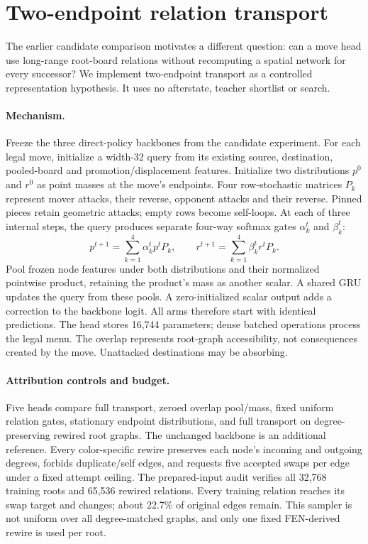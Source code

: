 \section{Two-endpoint relation transport}
The earlier candidate comparison motivates a different question: can a move
head use long-range root-board relations without recomputing a spatial network
for every successor? We implement two-endpoint transport as a controlled
representation hypothesis. It uses no afterstate, teacher shortlist or search.

\paragraph{Mechanism.}
Freeze the three direct-policy backbones from the candidate experiment. For
each legal move, initialize a width-32 query from its existing source,
destination, pooled-board and promotion/displacement features. Initialize two
distributions $p^0$ and $r^0$ as point masses at the move's endpoints. Four
row-stochastic matrices $P_k$ represent mover attacks, their reverse,
opponent attacks and their reverse. Pinned pieces retain geometric attacks;
empty rows become self-loops. At each of three internal steps, the query
produces separate four-way softmax gates $\alpha_k^t$ and $\beta_k^t$:
\begin{equation}
 p^{t+1}=\sum_{k=1}^{4}\alpha_k^t p^tP_k,
 \qquad r^{t+1}=\sum_{k=1}^{4}\beta_k^t r^tP_k.
\end{equation}
Pool frozen node features under both distributions and their normalized
pointwise product, retaining the product's mass as another scalar. A shared
GRU updates the query from these pools. A zero-initialized scalar output adds a
correction to the backbone logit. All arms therefore start with identical
predictions. The head stores 16,744 parameters; dense batched operations process
the legal menu. The overlap represents root-graph accessibility, not consequences
created by the move. Unattacked destinations may be absorbing.

\paragraph{Attribution controls and budget.}
Five heads compare full transport, zeroed overlap pool/mass, fixed uniform
relation gates, stationary endpoint distributions, and full transport on
degree-preserving rewired root graphs. The unchanged backbone is an additional
reference. Every color-specific rewire preserves each node's incoming and
outgoing degrees, forbids duplicate/self edges, and requests five accepted
swaps per edge under a fixed attempt ceiling. The prepared-input audit verifies
all 32,768 training roots and 65,536 rewired relations. Every training relation
reaches its swap target and changes; about 22.7\% of original edges remain.
This sampler is not uniform over all degree-matched graphs, and only one fixed
FEN-derived rewire is used per root.

